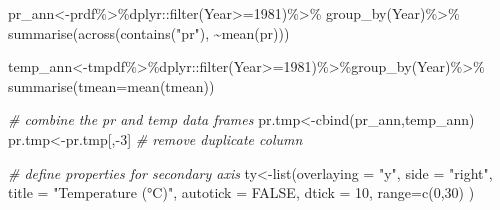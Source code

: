\documentclass[
]{book}
\newenvironment{Shaded}{\begin{snugshade}}{\end{snugshade}}
\newcommand{\AttributeTok}[1]{\textcolor[rgb]{0.77,0.63,0.00}{#1}}
\newcommand{\CommentTok}[1]{\textcolor[rgb]{0.56,0.35,0.01}{\textit{#1}}}
\newcommand{\ConstantTok}[1]{\textcolor[rgb]{0.00,0.00,0.00}{#1}}
\newcommand{\DecValTok}[1]{\textcolor[rgb]{0.00,0.00,0.81}{#1}}
\newcommand{\FunctionTok}[1]{\textcolor[rgb]{0.00,0.00,0.00}{#1}}
\newcommand{\NormalTok}[1]{#1}
\newcommand{\OtherTok}[1]{\textcolor[rgb]{0.56,0.35,0.01}{#1}}
\newcommand{\SpecialCharTok}[1]{\textcolor[rgb]{0.00,0.00,0.00}{#1}}
\newcommand{\StringTok}[1]{\textcolor[rgb]{0.31,0.60,0.02}{#1}}
\begin{document}
\begin{Shaded}
\begin{Highlighting}[]
\NormalTok{pr\_ann}\OtherTok{\textless{}{-}}\NormalTok{prdf}\SpecialCharTok{\%\textgreater{}\%}\NormalTok{dplyr}\SpecialCharTok{::}\FunctionTok{filter}\NormalTok{(Year}\SpecialCharTok{\textgreater{}=}\DecValTok{1981}\NormalTok{)}\SpecialCharTok{\%\textgreater{}\%} \FunctionTok{group\_by}\NormalTok{(Year)}\SpecialCharTok{\%\textgreater{}\%}
  \FunctionTok{summarise}\NormalTok{(}\FunctionTok{across}\NormalTok{(}\FunctionTok{contains}\NormalTok{(}\StringTok{"pr"}\NormalTok{), }\SpecialCharTok{\textasciitilde{}}\FunctionTok{mean}\NormalTok{(pr))) }


\NormalTok{temp\_ann}\OtherTok{\textless{}{-}}\NormalTok{tmpdf}\SpecialCharTok{\%\textgreater{}\%}\NormalTok{dplyr}\SpecialCharTok{::}\FunctionTok{filter}\NormalTok{(Year}\SpecialCharTok{\textgreater{}=}\DecValTok{1981}\NormalTok{)}\SpecialCharTok{\%\textgreater{}\%}\FunctionTok{group\_by}\NormalTok{(Year)}\SpecialCharTok{\%\textgreater{}\%}
  \FunctionTok{summarise}\NormalTok{(}\StringTok{\textquotesingle{}tmean\textquotesingle{}}\OtherTok{=}\FunctionTok{mean}\NormalTok{(tmean))}

\CommentTok{\# combine the pr and temp data frames}
\NormalTok{pr.tmp}\OtherTok{\textless{}{-}}\FunctionTok{cbind}\NormalTok{(pr\_ann,temp\_ann) }
\NormalTok{pr.tmp}\OtherTok{\textless{}{-}}\NormalTok{pr.tmp[,}\SpecialCharTok{{-}}\DecValTok{3}\NormalTok{] }\CommentTok{\# remove duplicate column}

\CommentTok{\# define properties for secondary axis}
\NormalTok{ty}\OtherTok{\textless{}{-}}\FunctionTok{list}\NormalTok{(}\AttributeTok{overlaying =} \StringTok{"y"}\NormalTok{,}
  \AttributeTok{side =} \StringTok{"right"}\NormalTok{,}
  \AttributeTok{title =} \StringTok{"Temperature (°C)"}\NormalTok{,}
  \AttributeTok{autotick =} \ConstantTok{FALSE}\NormalTok{,}
      \AttributeTok{dtick =} \DecValTok{10}\NormalTok{,}
 \AttributeTok{range=}\FunctionTok{c}\NormalTok{(}\DecValTok{0}\NormalTok{,}\DecValTok{30}\NormalTok{)}
\NormalTok{  )}


\end{Highlighting}
\end{Shaded}
\end{document}
